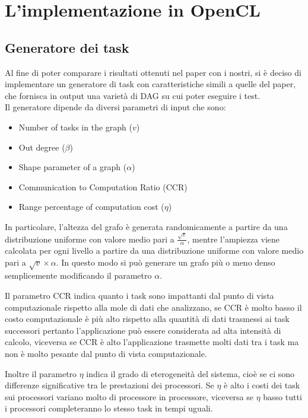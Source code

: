 \chapter{L'implementazione in OpenCL}
\vspace{4cm}


\section{Generatore dei task}
Al fine di poter comparare i risultati ottenuti nel paper\cite{ilavarasan2007low} con i nostri, si è deciso di implementare un generatore di task con caratteristiche simili a quelle del paper, che fornisca in output una varietà di DAG su cui poter eseguire i test.
\\
Il generatore dipende da diversi parametri di input che sono:
\begin{itemize}
	\item{Number of tasks in the graph ($v$)}
	\item{Out degree ($\beta$)}
	\item{Shape parameter of a graph ($\alpha$)}
	\item{Communication to Computation Ratio (CCR)}
	\item{Range percentage of computation cost ($\eta$)}
\end{itemize}

In particolare, l'altezza del grafo è generata randomicamente a partire da una distribuzione uniforme con valore medio pari a $\frac{\sqrt{v}}{\alpha}$, mentre l'ampiezza viene calcolata per ogni livello a partire da una distribuzione uniforme con valore medio pari a $\sqrt{v}\times\alpha$.
In questo modo si può generare un grafo più o meno denso semplicemente modificando il parametro $\alpha$.


Il parametro CCR indica quanto i task sono impattanti dal punto di vista computazionale rispetto alla mole di dati che analizzano, se CCR è molto basso il costo computazionale è più alto rispetto alla quantità di dati trasmessi ai task successori pertanto l'applicazione può essere considerata ad alta intensità di calcolo, viceversa se CCR è alto l'applicazione trasmette molti dati tra i task ma non è molto pesante dal punto di vista computazionale.

Inoltre il parametro $\eta$ indica il grado di eterogeneità del sistema, cioè se ci sono differenze significative tra le prestazioni dei processori. Se $\eta$ è alto i costi dei task sui processori variano molto di processore in processore, viceversa se $\eta$ basso tutti i processori completeranno lo stesso task in tempi uguali. 

